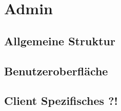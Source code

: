\chapter{Admin}


\section{Allgemeine Struktur}
\section{Benutzeroberfläche}
\section{Client Spezifisches ?!}

